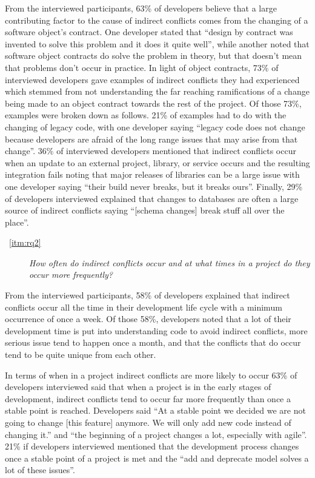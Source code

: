 \documentclass[conference]{IEEEtran}
\begin{document}
From the interviewed participants, 63\% of developers believe that a large contributing factor to the cause
of indirect conflicts comes from the changing of a software object's contract. One developer stated that ``design
by contract was invented to solve this problem and it does it quite well'', while another noted that software 
object contracts do solve the problem in theory, but that doesn't mean that problems don't occur in practice.
In light of object contracts, 73\% of interviewed developers gave examples of indirect conflicts they had experienced
which stemmed from not understanding the far reaching ramifications of a change being made to an object contract
towards the rest of the project. Of those 73\%, examples were broken down as follows. 21\% of examples had to do 
with the changing of legacy code, with one developer saying ``legacy code does not change because developers 
are afraid of the long range issues that may arise from that change''. 36\% of interviewed developers mentioned 
that indirect conflicts occur when an update to an external project, library, or service occurs and the resulting 
integration fails noting that major releases of libraries can be a large issue with one developer saying 
``their build never breaks, but it breaks ours''. Finally, 29\% of developers interviewed explained that changes to
databases are often a large source of indirect conflicts saying ``[schema changes] break stuff all over the place''.

\begin{description}
	\item[~\ref{itm:rq2}] \textit{How often do indirect conflicts occur and at what times in a project do they occur more frequently?}
\end{description}

From the interviewed participants, 58\% of developers explained that indirect conflicts occur all the time in
their development life cycle with a minimum occurrence of once a week. Of those 58\%, developers noted that a
lot of their development time is put into understanding code to avoid indirect conflicts, more serious issue tend
to happen once a month, and that the conflicts that do occur tend to be quite unique from each other.

In terms of when in a project indirect conflicts are more likely to occur 63\% of developers interviewed said that
when a project is in the early stages of development, indirect conflicts tend to occur far more frequently
than once a stable point is reached. Developers said ``At a stable point we decided we are not going to change
[this feature] anymore. We will only add new code instead of changing it.'' and ``the beginning of a project 
changes a lot, especially with agile''. 21\% if developers interviewed mentioned that the development process
changes once a stable point of a project is met and the ``add and deprecate model solves a lot of these issues''.
\end{document}
